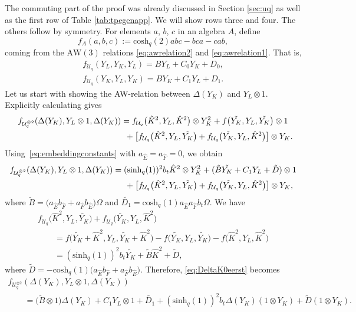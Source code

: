 \documentclass[pdftex]{sigma}
\numberwithin{equation}{section}
\newcommand{\aw}{\mathrm{AW}\!\left(3\right)}
\newcommand{\chq}{\mathrm{cosh}_q}
\newcommand{\shq}{\mathrm{sinh}_q}
\newcommand{\tensor}[1]{^{\otimes{#1}}}
\newcommand{\Uq}{\mathcal{U}_q}
\begin{document}
The commuting part of the proof was already discussed in Section \ref{sec:uq} as well as the first row of Table \ref{tab:tpegenapp}. We will show rows three and four. The others follow by symmetry. For elements $a$, $b$, $c$ in an algebra $A$, define
\[
f_A(a,b,c):=\chq(2)abc-bca-cab,
\]
coming from the $\aw$ relations \eqref{eq:awrelation2} and \eqref{eq:awrelation1}. That is,
\begin{gather*}
	f_{\Uq}(Y_L,Y_K,Y_L)=BY_L + C_0Y_K + D_0,\\
	f_{\Uq}(Y_K,Y_L,Y_K)=BY_K + C_1 Y_L + D_1.
\end{gather*}
Let us start with showing the AW-relation between $\Delta(Y_K)$ and $Y_L\otimes 1$. Explicitly calculating gives
\begin{gather*}
	f_{\Uq\tensor{2}}(\Delta(Y_K),Y_L\otimes 1,\Delta(Y_K)) =f_{\Uq}\big(\hat{K}^2,Y_L,\hat{K}^2\big)\otimes Y_K^2 +f\big(\tilde{Y_K},Y_L,\tilde{Y_K}\big)\otimes 1 \\
\hphantom{f_{\Uq\tensor{2}}(\Delta(Y_K),Y_L\otimes 1,\Delta(Y_K)) =}{}
 + \big[f_{\Uq}\big(\hat{K}^2,Y_L,\tilde{Y_K}\big)+f_{\Uq}\big(\tilde{Y_K},Y_L,\hat{K}^2\big)\big]\otimes Y_K.
\end{gather*}
Using~\eqref{eq:embeddingconstants} with $a_{\hat{E}}=a_{\hat{F}}=0$, we obtain
\begin{gather}
	f_{\Uq\tensor{2}}(\Delta(Y_K),Y_L\otimes 1,\Delta(Y_K)) =(\shq(1))^2b_t \hat{K}^2\otimes Y_K^2 +(\tilde{B}\tilde{Y_K}+C_1 Y_L +\tilde{D})\otimes 1 \nonumber \\
\hphantom{f_{\Uq\tensor{2}}(\Delta(Y_K),Y_L\otimes 1,\Delta(Y_K)) =}{}
 + \big[f_{\Uq}\big(\hat{K}^2,Y_L,\tilde{Y_K}\big)+f_{\Uq}\big(\tilde{Y_K},Y_L,\hat{K}^2\big)\big]\otimes Y_K,\label{eq:DeltaK0eerst}
\end{gather}
where $\tilde{B}=\big(a_{\hat{E}}b_{\hat{F}}+a_{\hat{F}}b_{\hat{E}}\big)\Omega$ and $\tilde{D_1}= \chq(1)a_{\hat{E}}a_{\hat{F}}b_t\Omega$.
We have
\begin{gather*}
	f_{\Uq}\big(\hat{K}^2,Y_L,\tilde{Y_K}\big)+f_{\Uq}\big(\tilde{Y_K},Y_L,\hat{K}^2\big)\\
\qquad{} = f\big(\tilde{Y_K}+\hat{K}^2,Y_L,\tilde{Y_K}+\hat{K}^2\big) -f\big(\tilde{Y_K},Y_L,\tilde{Y_K}\big)-f\big(\hat{K}^2,Y_L,\hat{K}^2\big)\\
	\qquad{}= (\shq(1))^2 b_t \tilde{Y_K}+\tilde{B} \hat{K}^2 +\tilde{D},
\end{gather*}
where $\tilde{D}=-\chq(1)\big(a_{\hat{E}}b_{\hat{F}}+a_{\hat{F}}b_{\hat{E}}\big)$.
Therefore, \eqref{eq:DeltaK0eerst} becomes
\begin{gather*}
f_{\Uq\tensor{2}}(\Delta(Y_K),Y_L\otimes 1,\Delta(Y_K))\\
\qquad{} =\big(\tilde{B}\otimes 1\big)\Delta(Y_K) + C_1 Y_L\otimes 1 + \tilde{D_1}
 + (\shq(1))^2b_t \Delta(Y_K)(1\otimes Y_K) +\tilde{D}(1\otimes Y_K). %
\end{gather*}
\end{document}
